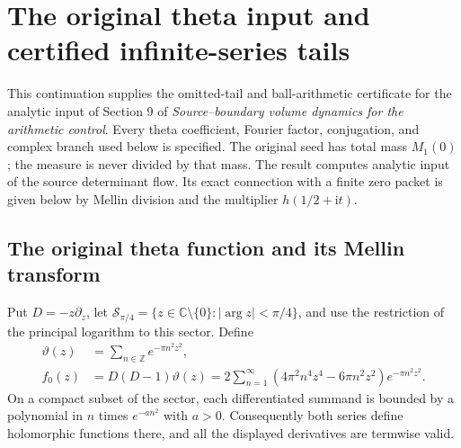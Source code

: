 \begingroup
\def\M{\mathcal M}
\def\F{\mathcal F}
\def\ii{\mathrm i}
\def\dd{\,\mathrm d}
\section{The original theta input and certified infinite-series tails}



This continuation supplies the omitted-tail and ball-arithmetic certificate
for the analytic input of Section 9 of \emph{Source--boundary volume
dynamics for the arithmetic control}. Every theta coefficient, Fourier
factor, conjugation, and complex branch used below is specified. The
original seed has total mass $M_1(0)$; the measure is never divided by
that mass. The result computes analytic input of the source determinant
flow. Its exact connection with a finite zero packet is given below by
Mellin division and the multiplier $h(1/2+\ii t)$.

\subsection{The original theta function and its Mellin transform}

Put $D=-z\partial_z$, let
$\mathcal S_{\pi/4}=\{z\in\mathbb C\setminus\{0\}:|\arg z|<\pi/4\}$,
and use the restriction of the principal logarithm to this sector. Define
\begin{align}
 \vartheta(z)&=\sum_{n\in\mathbb Z}e^{-\pi n^2z^2},\tag{TI.1}\\
 f_0(z)&=D(D-1)\vartheta(z)
 =2\sum_{n=1}^\infty(4\pi^2n^4z^4-6\pi n^2z^2)e^{-\pi n^2z^2}.
 \tag{TI.2}
\end{align}
On a compact subset of the sector, each differentiated summand is
bounded by a polynomial in $n$ times $e^{-a n^2}$ with $a>0$.
Consequently both series define holomorphic functions there, and all
the displayed derivatives are termwise valid.


